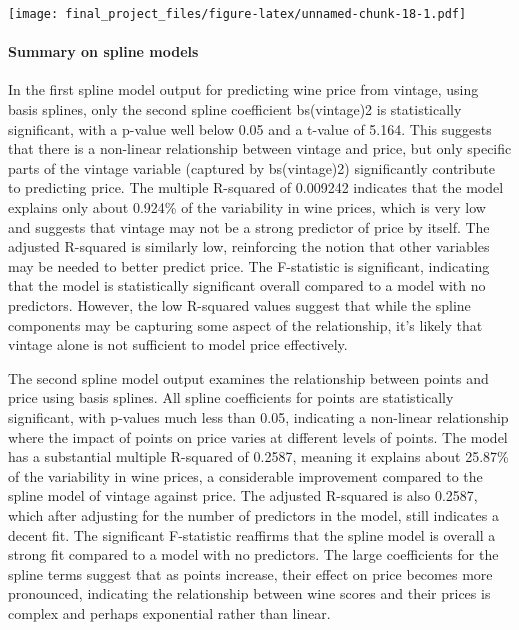 \documentclass[
]{article}
\begin{document}
\texttt{[image: final\_project\_files/figure-latex/unnamed-chunk-18-1.pdf]}

\hypertarget{summary-on-spline-models}{%
\paragraph{Summary on spline models}\label{summary-on-spline-models}}

In the first spline model output for predicting wine price from vintage,
using basis splines, only the second spline coefficient bs(vintage)2 is
statistically significant, with a p-value well below 0.05 and a t-value
of 5.164. This suggests that there is a non-linear relationship between
vintage and price, but only specific parts of the vintage variable
(captured by bs(vintage)2) significantly contribute to predicting price.
The multiple R-squared of 0.009242 indicates that the model explains
only about 0.924\% of the variability in wine prices, which is very low
and suggests that vintage may not be a strong predictor of price by
itself. The adjusted R-squared is similarly low, reinforcing the notion
that other variables may be needed to better predict price. The
F-statistic is significant, indicating that the model is statistically
significant overall compared to a model with no predictors. However, the
low R-squared values suggest that while the spline components may be
capturing some aspect of the relationship, it's likely that vintage
alone is not sufficient to model price effectively.

The second spline model output examines the relationship between points
and price using basis splines. All spline coefficients for points are
statistically significant, with p-values much less than 0.05, indicating
a non-linear relationship where the impact of points on price varies at
different levels of points. The model has a substantial multiple
R-squared of 0.2587, meaning it explains about 25.87\% of the
variability in wine prices, a considerable improvement compared to the
spline model of vintage against price. The adjusted R-squared is also
0.2587, which after adjusting for the number of predictors in the model,
still indicates a decent fit. The significant F-statistic reaffirms that
the spline model is overall a strong fit compared to a model with no
predictors. The large coefficients for the spline terms suggest that as
points increase, their effect on price becomes more pronounced,
indicating the relationship between wine scores and their prices is
complex and perhaps exponential rather than linear.
\end{document}
